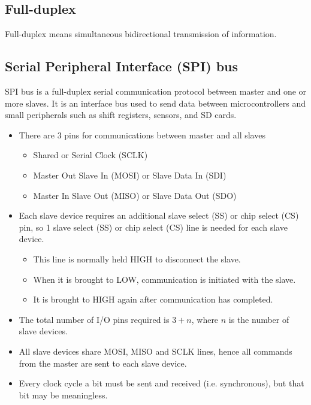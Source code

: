 \documentclass[11pt]{article}
\begin{document}
\subsection{Full-duplex}
\label{sec:org95c933b}
Full-duplex means simultaneous bidirectional transmission of information.

 \newpage

\subsection{Serial Peripheral Interface (SPI) bus}
\label{sec:org2641e1f}
SPI bus is a full-duplex serial communication protocol between master and one or more slaves. It is an interface bus used to send data between microcontrollers and small peripherals such as shift registers, sensors, and SD cards.

\begin{itemize}
\item There are 3 pins for communications between master and all slaves
\begin{itemize}
\item Shared or Serial Clock (SCLK)
\item Master Out Slave In (MOSI) or Slave Data In (SDI)
\item Master In Slave Out (MISO) or Slave Data Out (SDO)
\end{itemize}
\item Each slave device requires an additional slave select (SS) or chip select (CS) pin, so 1 slave select (SS) or chip select (CS) line is needed for each slave device.
\begin{itemize}
\item This line is normally held HIGH to disconnect the slave.
\item When it is brought to LOW, communication is initiated with the slave.
\item It is brought to HIGH again after communication has completed.
\end{itemize}
\item The total number of I/O pins required is \(3 + n\), where \(n\) is the number of slave devices.
\item All slave devices share MOSI, MISO and SCLK lines, hence all commands from the master are sent to each slave device.
\item Every clock cycle a bit must be sent and received (i.e. synchronous), but that bit may be meaningless.
\end{itemize}
\end{document}
